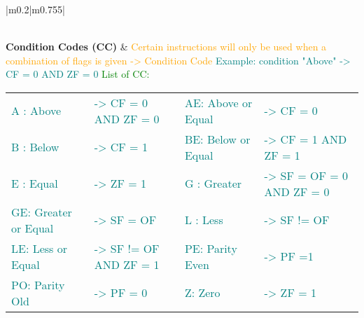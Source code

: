 \documentclass[main.tex,fontsize=8pt,paper=a4,paper=portrait,DIV=calc,]{scrartcl}
\begin{document}
\begin{table}[ht!]
\begin{tabular}{|m{0.2\linewidth}|m{0.755\linewidth}|}
\begin{itemize}
\vspace{-3mm}
\end{itemize}\\
\hline
\textbf{Condition Codes (CC)} & 
\textcolor{orange}{Certain instructions will only be used when a combination of flags is given -> Condition Code}\newline
\textcolor{teal}{Example: condition "Above" -> CF = 0 AND ZF = 0}\newline
\textcolor{green}{List of CC:}\newline
\begin{tabular}{|ll|ll|}
\hline
\textcolor{teal}{A : Above }& \textcolor{teal}{ -> CF = 0 AND ZF = 0}&
\textcolor{teal}{AE: Above or Equal } & \textcolor{teal}{ -> CF = 0}\\
\textcolor{teal}{B : Below } & \textcolor{teal}{ -> CF = 1}&
\textcolor{teal}{BE: Below or Equal } & \textcolor{teal}{ -> CF = 1 AND ZF = 1}\\
\textcolor{teal}{E : Equal }& \textcolor{teal}{ -> ZF = 1}&
\textcolor{teal}{G : Greater }& \textcolor{teal}{ -> SF = OF = 0 AND ZF = 0}\\
\textcolor{teal}{GE: Greater or Equal }& \textcolor{teal}{ -> SF = OF}&
\textcolor{teal}{L : Less }& \textcolor{teal}{ -> SF != OF}\\
\textcolor{teal}{LE: Less or Equal }& \textcolor{teal}{ -> SF != OF AND ZF = 1}&
\textcolor{teal}{PE: Parity Even} & \textcolor{teal}{ -> PF =1}\\
\textcolor{teal}{PO: Parity Old } & \textcolor{teal}{ -> PF = 0}&
\textcolor{teal}{Z:  Zero}&\textcolor{teal}{ -> ZF = 1} \\
\end{tabular}
\\
\hline
\end{tabular}
\end{table}
\pagebreak
\end{document}
